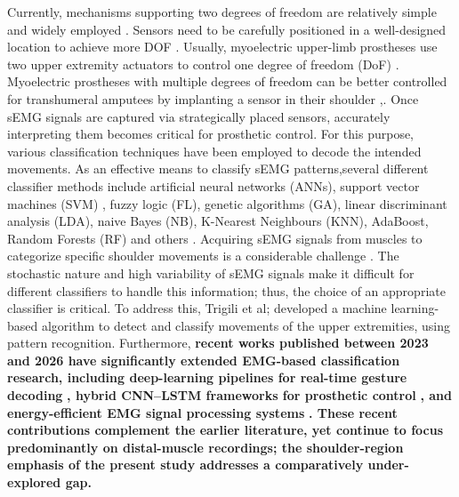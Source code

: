 \documentclass{elektr}
\newcommand{\yh}[1]{{\color{revhi}\textbf{#1}}}
\begin{document}
Currently, mechanisms supporting two degrees of freedom are relatively simple and widely employed \cite{chaobankoh2024classification}. Sensors need to be carefully positioned in a well-designed location to achieve more DOF \cite{jarrasse2016classification}. Usually, myoelectric upper-limb prostheses use two upper extremity actuators to control one degree of freedom (DoF)  \cite{thomson2025myoelectric}. Myoelectric prostheses with multiple degrees of freedom can be better controlled for transhumeral amputees by implanting a sensor in their shoulder \cite{chaobankoh2024classification},\cite{jarrasse2016classification}. Once sEMG signals are captured via strategically placed sensors, accurately interpreting them becomes critical for prosthetic control. For this purpose, various classification techniques have been employed to decode the intended movements. As an effective means to classify sEMG patterns\cite{li2017motion,xie2015comparative,thermalBreastXAI},several different classifier methods include artificial neural networks (ANNs), support vector machines (SVM) \cite {singh2020comparative}, fuzzy logic (FL), genetic algorithms (GA), linear discriminant analysis (LDA), naive Bayes (NB), K-Nearest Neighbours (KNN), AdaBoost, Random Forests (RF) and others \cite{seyidbayli2020comparison}. Acquiring sEMG signals from muscles to categorize specific shoulder movements is a considerable challenge \cite{rani2023surface}. The stochastic nature and high variability of sEMG signals make it difficult for different classifiers to handle this information; thus, the choice of an appropriate classifier is critical\cite{zhang2024improving}. To address this, Trigili et al;\cite{trigili2019detection} developed a machine learning-based algorithm to detect and classify movements of the upper extremities, using pattern recognition. Furthermore, \yh{recent works published between 2023 and 2026 have significantly extended EMG-based classification research, including deep-learning pipelines for real-time gesture decoding} \cite{ref2024_en17112539,ref2024_electronics13173552}\yh{, hybrid CNN--LSTM frameworks for prosthetic control} \cite{ref2025_cmes065098}\yh{, and energy-efficient EMG signal processing systems} \cite{ref2024_en17215412}\yh{. These recent contributions complement the earlier literature, yet continue to focus predominantly on distal-muscle recordings; the shoulder-region emphasis of the present study addresses a comparatively under-explored gap.}\\
\end{document}
